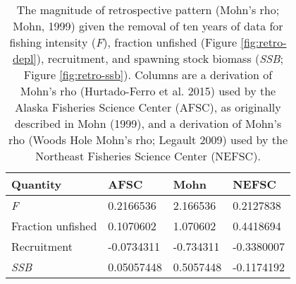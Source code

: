 \begin{longtable}[t]{llll}
\caption{\label{tab:RetroMohnsrho}The magnitude of retrospective pattern (Mohn's rho; Mohn, 1999) given the removal of ten years of data for fishing intensity (\emph{F}), fraction unfished (Figure \ref{fig:retro-depl}),  recruitment, and spawning stock biomass (\emph{SSB}; Figure \ref{fig:retro-ssb}). Columns are a derivation of Mohn's rho (Hurtado-Ferro et al. 2015) used by the Alaska Fisheries Science Center (AFSC), as originally described in Mohn (1999), and a derivation of Mohn's rho (Woods Hole Mohn's rho; Legault 2009) used by the Northeast Fisheries Science Center (NEFSC).}\\
\toprule
Quantity & AFSC & Mohn & NEFSC\\
\midrule
\emph{F} & 0.2166536 & 2.166536 & 0.2127838\\
Fraction unfished & 0.1070602 & 1.070602 & 0.4418694\\
Recruitment & -0.0734311 & -0.734311 & -0.3380007\\
\emph{SSB} & 0.05057448 & 0.5057448 & -0.1174192\\
\bottomrule
\end{longtable}
